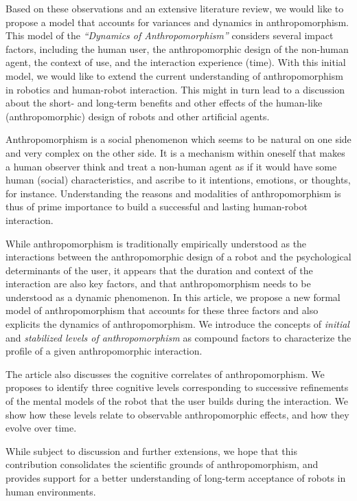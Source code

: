\documentclass{frontiersSCNS} %
\begin{document}
Based on these observations and an extensive literature review, we would like to
propose a model that accounts for variances and dynamics in anthropomorphism.
This model of the \textit{``Dynamics of Anthropomorphism''} considers several
impact factors, including the human user, the anthropomorphic design of the
non-human agent, the context of use, and the interaction experience (time). With
this initial model, we would like to extend the current understanding of
anthropomorphism in robotics and human-robot interaction. This might in turn
lead to a discussion about the short- and long-term benefits and other effects
of the human-like (anthropomorphic) design of robots and other artificial
agents.


Anthropomorphism is a social phenomenon which seems to be natural on one side
and very complex on the other side. It is a mechanism within oneself that makes
a human observer think and treat a non-human agent as if it would have some
human (social) characteristics, and ascribe to it intentions, emotions, or
thoughts, for instance. Understanding the reasons and modalities of
anthropomorphism is thus of prime importance to build a successful and lasting
human-robot interaction.

While anthropomorphism is traditionally empirically understood as the
interactions between the anthropomorphic design of a robot and the psychological
determinants of the user, it appears that the duration and context of the
interaction are also key factors, and that anthropomorphism needs to be
understood as a dynamic phenomenon. In this article, we propose a new formal
model of anthropomorphism that accounts for these three factors and also
explicits the dynamics of anthropomorphism. We introduce the concepts of
\emph{initial} and \emph{stabilized levels of anthropomorphism} as compound
factors to characterize the profile of a given anthropomorphic interaction.

The article also discusses the cognitive correlates of anthropomorphism. We
proposes to identify three cognitive levels corresponding to successive
refinements of the mental models of the robot that the user builds during the
interaction. We show how these levels relate to observable anthropomorphic
effects, and how they evolve over time.

While subject to discussion and further extensions, we hope that this
contribution consolidates the scientific grounds of anthropomorphism, and
provides support for a better understanding of long-term acceptance of robots in
human environments.
\end{document}
